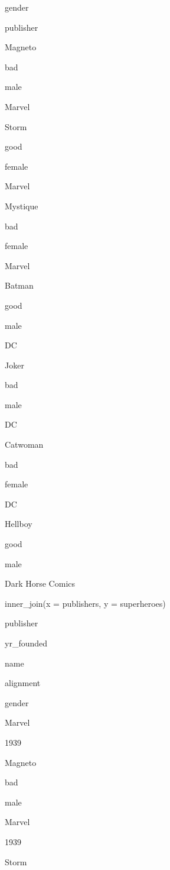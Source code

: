gender
 
publisher
 



Magneto
 
bad
 
male
 
Marvel
 


Storm
 
good
 
female
 
Marvel
 


Mystique
 
bad
 
female
 
Marvel
 


Batman
 
good
 
male
 
DC
 


Joker
 
bad
 
male
 
DC
 


Catwoman
 
bad
 
female
 
DC
 


Hellboy
 
good
 
male
 
Dark Horse Comics
 


inner_join(x = publishers, y = superheroes)
 


publisher
 
yr_founded
 
name
 
alignment
 
gender
 



Marvel
 
1939
 
Magneto
 
bad
 
male
 


Marvel
 
1939
 
Storm
 
